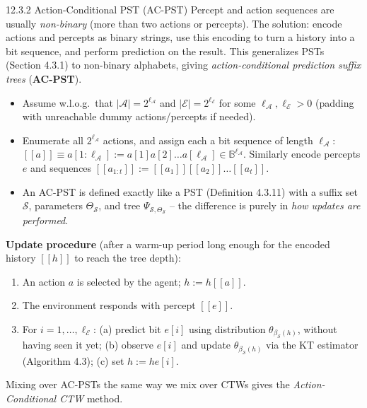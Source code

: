 \documentclass[aspectratio=169,10pt]{beamer}
\newcommand{\BB}{\mathbb{B}}
\newcommand{\Acal}{\mathcal{A}}
\newcommand{\Ecal}{\mathcal{E}}
\newcommand{\Scal}{\mathcal{S}}
\begin{document}
\begin{frame}{12.3.2 Action-Conditional PST (AC-PST)}
\small
Percept and action sequences are usually \emph{non-binary} (more than two actions or
percepts). The solution: encode actions and percepts as binary strings, use this encoding
to turn a history into a bit sequence, and perform prediction on the result. This
generalizes PSTs (Section 4.3.1) to non-binary alphabets, giving
\emph{action-conditional prediction suffix trees} (\textbf{AC-PST}).
\begin{itemize}
\item Assume w.l.o.g.\ that $|\Acal|=2^{\ell_\Acal}$ and $|\Ecal|=2^{\ell_\Ecal}$ for some
$\ell_\Acal,\ell_\Ecal>0$ (padding with unreachable dummy actions/percepts if needed).
\item Enumerate all $2^{\ell_\Acal}$ actions, and assign each a bit sequence of length
$\ell_\Acal$: $[\![a]\!]\equiv a[1{:}\ell_\Acal]:=a[1]a[2]\ldots a[\ell_\Acal]\in\BB^{\ell_\Acal}$.
Similarly encode percepts $e$ and sequences $[\![a_{1:t}]\!]:=[\![a_1]\!][\![a_2]\!]\ldots[\![a_t]\!]$.
\item An AC-PST is defined exactly like a PST (Definition 4.3.11) with a suffix set
$\Scal$, parameters $\Theta_\Scal$, and tree $\Psi_{\Scal,\Theta_\Scal}$ -- the difference
is purely in \emph{how updates are performed}.
\end{itemize}
\textbf{Update procedure} (after a warm-up period long enough for the encoded history
$[\![h]\!]$ to reach the tree depth):
\begin{enumerate}
\item An action $a$ is selected by the agent; $h:=h[\![a]\!]$.
\item The environment responds with percept $[\![e]\!]$.
\item For $i=1,\dots,\ell_\Ecal$: (a) predict bit $e[i]$ using distribution
$\theta_{\beta_\Scal(h)}$, without having seen it yet; (b) observe $e[i]$ and update
$\theta_{\beta_\Scal(h)}$ via the KT estimator (Algorithm 4.3); (c) set $h:=he[i]$.
\end{enumerate}
Mixing over AC-PSTs the same way we mix over CTWs gives the \emph{Action-Conditional CTW}
method.
\end{frame}
\end{document}
